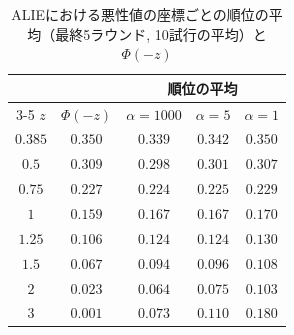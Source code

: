 \documentclass[a4j, twocolumn, dvipdfmx]{jsarticle}
\begin{document}
\begin{table}[H]
\centering
\caption{ALIEにおける悪性値の座標ごとの順位の平均（最終5ラウンド, 10試行の平均）と $\Phi(-z)$}
\label{tab:rank}
\begin{tabular}{@{}ccccc@{}}
\toprule
 & & \multicolumn{3}{c}{順位の平均} \\
\cmidrule(l){3-5}
$z$ & $\Phi(-z)$ & $\alpha=1000$ & $\alpha=5$ & $\alpha=1$ \\
\midrule
$0.385$ & $0.350$ & $0.339$ & $0.342$ & $0.350$ \\
$0.5$ & $0.309$ & $0.298$ & $0.301$ & $0.307$ \\
$0.75$ & $0.227$ & $0.224$ & $0.225$ & $0.229$ \\
$1$ & $0.159$ & $0.167$ & $0.167$ & $0.170$ \\
$1.25$ & $0.106$ & $0.124$ & $0.124$ & $0.130$ \\
$1.5$ & $0.067$ & $0.094$ & $0.096$ & $0.108$ \\
$2$ & $0.023$ & $0.064$ & $0.075$ & $0.103$ \\
$3$ & $0.001$ & $0.073$ & $0.110$ & $0.180$ \\
\bottomrule
\end{tabular}
\end{table}
\end{document}

